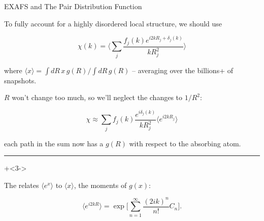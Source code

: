 \begin{slide}{EXAFS and The Pair Distribution Function}


  To fully account for a highly disordered local structure, we should use

\[
    \chi(k)  = \Biggl\langle \sum_j {\frac{f_j(k)e^{i2kR_j + \delta_j(k)}}{kR_j^2}} \Biggr\rangle
\]

where $ \langle x \rangle = \int dR\, x \, g(R) / \int dR\, g(R) $ --
averaging over the billions+ of snapshots.

\vmm\pause
$R$ won't change too much, so we'll neglect the changes to $1/R^2$:

\[
  \chi \approx
  \sum_j {f_j(k){\frac{e^{ i\delta_j(k)} }{kR_j^2}}}   \biggl\langle e^{i2kR_j}  \biggr\rangle
\]

each path in the sum now has a $g(R)$ with respect to the absorbing atom.

\vmm \hrule \vmm \onslide+<3->

The {} relates $\langle e^x\rangle$ to $\langle x \rangle$, the moments of $g(x)$:


\[ \biggl\langle e^{i2kR} \biggr\rangle
= \exp \bigg[ \sum_{n=1}^{\infty} { \frac{(2ik)^n}{n!}}C_n  \bigg].
\]



\vfill
\end{slide}

